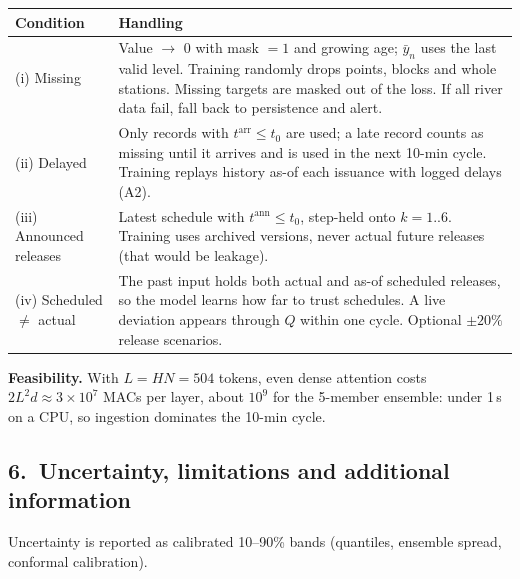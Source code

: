 \documentclass[11pt, a4paper]{article}
\begin{document}
\begin{center}\small
\begin{tabularx}{\textwidth}{@{}l X@{}}
\toprule
Condition & Handling\\
\midrule
(i) Missing & Value $\to$ 0 with mask $=1$ and growing age; $\bar y_n$ uses the last valid level. Training randomly drops points, blocks and whole stations. Missing targets are masked out of the loss. If all river data fail, fall back to persistence and alert.\\
(ii) Delayed & Only records with $t^{\mathrm{arr}}\le t_0$ are used; a late record counts as missing until it arrives and is used in the next 10-min cycle. Training replays history as-of each issuance with logged delays (A2).\\
(iii) Announced releases & Latest schedule with $t^{\mathrm{ann}}\le t_0$, step-held onto $k=1..6$. Training uses archived versions, never actual future releases (that would be leakage).\\
(iv) Scheduled $\ne$ actual & The past input holds both actual and as-of scheduled releases, so the model learns how far to trust schedules. A live deviation appears through $Q$ within one cycle. Optional $\pm20\%$ release scenarios.\\
\bottomrule
\end{tabularx}
\end{center}

\noindent\textbf{Feasibility.} With $L=HN=504$ tokens, even dense attention costs $2L^2d\approx3\times10^7$ MACs per layer, about $10^9$ for the 5-member ensemble: under 1\,s on a CPU, so ingestion dominates the 10-min cycle.

\subsection*{6.\ Uncertainty, limitations and additional information}

Uncertainty is reported as calibrated 10--90\% bands (quantiles, ensemble spread, conformal calibration).
\end{document}
